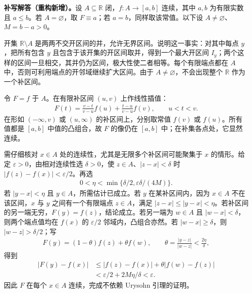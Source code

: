 \documentclass[../../main.tex]{subfiles}%
\begin{document}
\begin{solution}
\textbf{补写解答（重构新增）。}设 $A\subseteq\mathbb R$ 闭，$f:A\to[a,b]$ 连续，其中 $a,b$ 为有限实数且 $a\le b$。若 $A=\varnothing$，取 $F\equiv a$；若 $a=b$，同样取该常值。以下设 $A\ne\varnothing$、$M=b-a>0$。

开集 $\mathbb R\setminus A$ 是两两不交开区间的并，允许无界区间。说明这一事实：对其中每点 $y$，把所有包含 $y$ 且包含于该开集的开区间取并，得到一个最大开区间 $I_y$；两个这样的区间一旦相交，其并仍为区间，极大性使二者相等。每个有限端点都在 $A$ 中，否则可利用端点的开邻域继续扩大区间。由于 $A\ne\varnothing$，不会出现整个 $\mathbb R$ 作为一个补区间。

令 $F=f$ 于 $A$。在有限补区间 $(u,v)$ 上作线性插值：
\begin{align*}
F(t)=\frac{v-t}{v-u}f(u)+\frac{t-u}{v-u}f(v),\qquad u<t<v.
\end{align*}
在形如 $(-\infty,v)$ 或 $(u,\infty)$ 的补区间上，分别取常值 $f(v)$ 或 $f(u)$。所有值都是 $[a,b]$ 中值的凸组合，故 $F$ 的像仍在 $[a,b]$ 中；在补集各点处，它显然连续。

需仔细核对 $x\in A$ 处的连续性，尤其是无限多个补区间可能聚集于 $x$ 的情形。给定 $\varepsilon>0$，由相对连续性选 $\delta>0$，使 $z\in A$、$|z-x|<\delta$ 时 $|f(z)-f(x)|<\varepsilon/2$。再选
\begin{align*}
0<\eta<\min\{\delta/2,\varepsilon\delta/(4M)\}.
\end{align*}
若 $|y-x|<\eta$ 且 $y\in A$，所需估计已成立。若 $y$ 在某补区间内，因为 $x\in A$ 不在该区间，$x$ 与 $y$ 之间有一个有限端点 $z\in A$，满足 $|z-x|\le|y-x|<\eta$。若补区间的另一端无穷，$F(y)=f(z)$，结论成立。若另一端为 $w\in A$ 且 $|w-x|<\delta$，则两个端点值均在 $f(x)$ 的 $\varepsilon/2$ 邻域内，凸组合亦然。若 $|w-x|\ge\delta$，则 $|w-z|>\delta/2$；写
\begin{align*}
F(y)=(1-\theta)f(z)+\theta f(w),\qquad
\theta=\frac{|y-z|}{|w-z|}<\frac{2\eta}{\delta},
\end{align*}
得到
\begin{align*}
|F(y)-f(x)|
&\le |f(z)-f(x)|+\theta|f(w)-f(z)|\\
&<\varepsilon/2+2M\eta/\delta<\varepsilon.
\end{align*}
因此 $F$ 在每个 $x\in A$ 连续，完成不依赖 Urysohn 引理的证明。
\end{solution}
\end{document}
